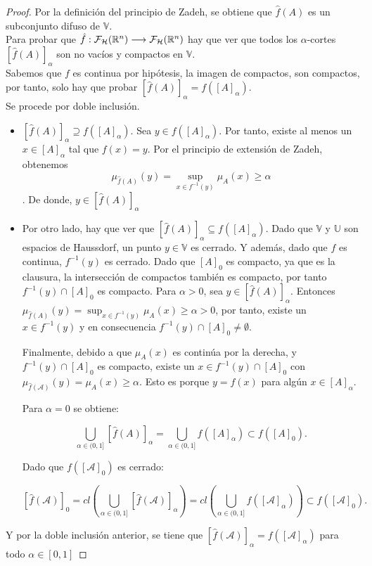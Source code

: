   \begin{proof}
    Por la definición del principio de Zadeh, se obtiene que $\hat{f}(A)$ es un subconjunto difuso de $\mathbb{V}$. \\
    Para probar que $\hat{f} : \mathcal{F}_\mathcal{H}(\mathbb R^n) \longrightarrow \mathcal{F}_\mathcal{H}(\mathbb R^n)$ hay que ver que todos los $\alpha$-cortes $[\hat{f}(A)]_\alpha$ son no vacíos y compactos en $\mathbb{V}$. \\
    Sabemos que $f$ es continua por hipótesis, la imagen de compactos, son compactos, por tanto, solo hay que probar $[\hat{f}(A)]_\alpha = f([A]_\alpha)$. \\
    Se procede por doble inclusión.
    
    \begin{itemize}
    \item $[\hat{f}(A)]_\alpha \supseteq f([A]_\alpha)$. Sea $y \in f([A]_\alpha)$. Por tanto, existe al menos un $x \in [A]_\alpha$ tal que $f(x)=y$. Por el principio de extensión de Zadeh, obtenemos $$\mu_{\hat{f}(A)}(y)=\sup_{x\in f^{-1}(y)} \mu_A(x) \geq \alpha$$. De donde, $y \in [\hat{f}(A)]_\alpha$
    \item Por otro lado, hay que ver que $[\hat{f}(A)]_\alpha \subseteq f([A]_\alpha)$. Dado que $\mathbb{V}$ y $\mathbb{U}$ son espacios de Haussdorf, un punto $y \in \mathbb{V}$ es cerrado. Y además, dado que $f$ es continua, $f^{-1}(y)$ es cerrado. Dado que $[A]_0$ es compacto, ya que es la clausura, la intersección de compactos también es compacto, por tanto $f^{-1}(y) \cap [A]_0$ es compacto. Para $\alpha>0$, sea $y \in [\hat{f}(A)]_\alpha$. Entonces $\mu_{\hat{f}(A)}(y)=\sup_{x\in f^{-1}(y)} \mu_A(x) \geq \alpha>0$, por tanto, existe un $x\in f^{-1}(y)$ y en consecuencia $f^{-1}(y) \cap [A]_0 \neq \emptyset$.
    
    Finalmente, debido a que $\mu_A(x)$ es continúa por la derecha, y $f^{-1}(y) \cap [A]_0$ es compacto, existe un $x \in f^{-1}(y) \cap [A]_0$ con $\mu_{\hat{f}(\mathcal{A})}(y)=\mu_{A}(x) \geq \alpha$. Esto es porque $y=f(x)$ para algún $x \in [A]_\alpha$.
    
    Para $\alpha=0$ se obtiene:
    
    $$
    \bigcup_{\alpha \in (0, 1]} [\hat{f}(A)]_\alpha = \bigcup_{\alpha \in (0, 1]} f([A]_\alpha) \subset f([A]_0).
	$$
	
	Dado que $f([\mathcal{A}]_0)$ es cerrado:
	
	$$
	[\hat{f}(\mathcal{A})]_0 = cl\left( \bigcup_{\alpha \in (0, 1]} [\hat{f}(\mathcal{A})]_\alpha  \right) = cl\left(\bigcup_{\alpha \in (0, 1]} f([\mathcal{A}]_\alpha) \right)	\subset f([\mathcal{A}]_0).
	    $$
	     \end{itemize}
	    Y por la doble inclusión anterior, se tiene que $[\hat{f}(\mathcal{A})]_\alpha = f([\mathcal{A}]_\alpha)$ para todo $\alpha \in [0, 1]$
  \end{proof}



